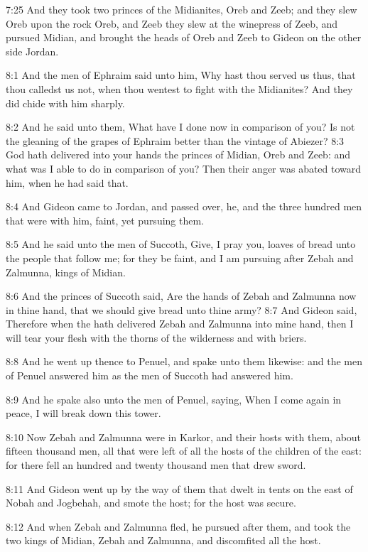 7:25 And they took two princes of the Midianites, Oreb and Zeeb; and they slew Oreb upon the rock Oreb, and Zeeb they slew at the winepress of Zeeb, and pursued Midian, and brought the heads of Oreb and Zeeb to Gideon on the other side Jordan.

8:1 And the men of Ephraim said unto him, Why hast thou served us thus, that thou calledst us not, when thou wentest to fight with the Midianites?  And they did chide with him sharply.

8:2 And he said unto them, What have I done now in comparison of you?  Is not the gleaning of the grapes of Ephraim better than the vintage of Abiezer?  8:3 God hath delivered into your hands the princes of Midian, Oreb and Zeeb: and what was I able to do in comparison of you?  Then their anger was abated toward him, when he had said that.

8:4 And Gideon came to Jordan, and passed over, he, and the three hundred men that were with him, faint, yet pursuing them.

8:5 And he said unto the men of Succoth, Give, I pray you, loaves of bread unto the people that follow me; for they be faint, and I am pursuing after Zebah and Zalmunna, kings of Midian.

8:6 And the princes of Succoth said, Are the hands of Zebah and Zalmunna now in thine hand, that we should give bread unto thine army?  8:7 And Gideon said, Therefore when the \LORD hath delivered Zebah and Zalmunna into mine hand, then I will tear your flesh with the thorns of the wilderness and with briers.

8:8 And he went up thence to Penuel, and spake unto them likewise: and the men of Penuel answered him as the men of Succoth had answered him.

8:9 And he spake also unto the men of Penuel, saying, When I come again in peace, I will break down this tower.

8:10 Now Zebah and Zalmunna were in Karkor, and their hosts with them, about fifteen thousand men, all that were left of all the hosts of the children of the east: for there fell an hundred and twenty thousand men that drew sword.

8:11 And Gideon went up by the way of them that dwelt in tents on the east of Nobah and Jogbehah, and smote the host; for the host was secure.

8:12 And when Zebah and Zalmunna fled, he pursued after them, and took the two kings of Midian, Zebah and Zalmunna, and discomfited all the host.


